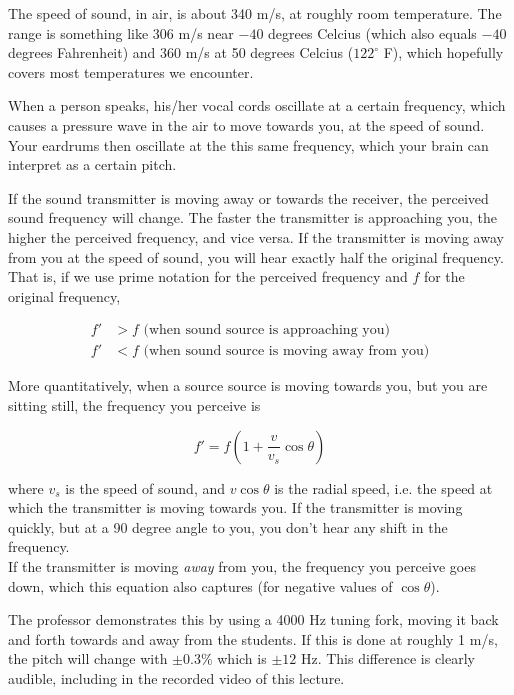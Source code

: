 The speed of sound, in air, is about 340 m/s, at roughly room temperature. The range is something like 306 m/s near $-40$ degrees Celcius (which also equals $-40$ degrees Fahrenheit) and 360 m/s at 50 degrees Celcius ($122^\circ$ F), which hopefully covers most temperatures we encounter.

When a person speaks, his/her vocal cords oscillate at a certain frequency, which causes a pressure wave in the air to move towards you, at the speed of sound. Your eardrums then oscillate at the this same frequency, which your brain can interpret as a certain pitch.

If the sound transmitter is moving away or towards the receiver, the perceived sound frequency will change. The faster the transmitter is approaching you, the higher the perceived frequency, and vice versa. If the transmitter is moving away from you at the speed of sound, you will hear exactly half the original frequency.\\
That is, if we use prime notation for the perceived frequency and $f$ for the original frequency,

\begin{align}
f' &> f \text{ (when sound source is approaching you)}\\
f' &< f \text{ (when sound source is moving away from you)}
\end{align}

More quantitatively, when a source source is moving towards you, but you are sitting still, the frequency you perceive is

\begin{equation}
f' = f(1 + \frac{v}{v_s} \cos \theta)
\end{equation}

where $v_s$ is the speed of sound, and $v \cos \theta$ is the radial speed, i.e. the speed at which the transmitter is moving towards you. If the transmitter is moving quickly, but at a 90 degree angle to you, you don't hear any shift in the frequency.\\
If the transmitter is moving \emph{away} from you, the frequency you perceive goes down, which this equation also captures (for negative values of $\cos \theta$).

The professor demonstrates this by using a 4000 Hz tuning fork, moving it back and forth towards and away from the students. If this is done at roughly 1 m/s, the pitch will change with $\pm 0.3$\% which is $\pm 12$ Hz. This difference is clearly audible, including in the recorded video of this lecture.

